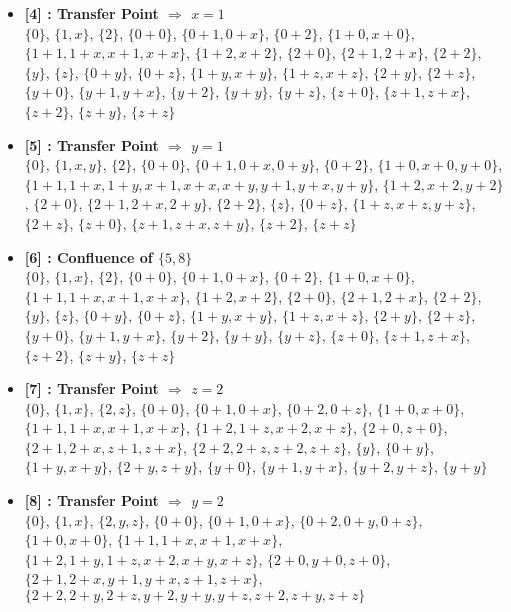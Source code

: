 \begin{itemize}
    \item \textbf{[4] : Transfer Point $\Rightarrow$ $x = 1$}\\
        $\{0\}$, $\{1, x\}$, $\{2\}$, $\{0 + 0\}$, $\{0 + 1, 0 + x\}$, $\{0 + 2\}$, $\{1 + 0, x + 0\}$, $\{1 + 1, 1 + x, x + 1, x + x\}$, $\{1 + 2, x + 2\}$, $\{2 + 0\}$, $\{2 + 1, 2 + x\}$, $\{2 + 2\}$, $\{y\}$, $\{z\}$, $\{0 + y\}$, $\{0 + z\}$, $\{1 + y, x + y\}$, $\{1 + z, x + z\}$, $\{2 + y\}$, $\{2 + z\}$, $\{y + 0\}$, $\{y + 1, y + x\}$, $\{y + 2\}$, $\{y + y\}$, $\{y + z\}$, $\{z + 0\}$, $\{z + 1, z + x\}$, $\{z + 2\}$, $\{z + y\}$, $\{z + z\}$

    \item \textbf{[5] : Transfer Point $\Rightarrow$ $y = 1$}\\
        $\{0\}$, $\{1, x, y\}$, $\{2\}$, $\{0 + 0\}$, $\{0 + 1, 0 + x, 0 + y\}$, $\{0 + 2\}$, $\{1 + 0, x + 0, y + 0\}$, $\{1 + 1, 1 + x, 1 + y, x + 1, x + x, x + y, y + 1, y + x, y + y\}$, $\{1 + 2, x + 2, y + 2\}$, $\{2 + 0\}$, $\{2 + 1, 2 + x, 2 + y\}$, $\{2 + 2\}$, $\{z\}$, $\{0 + z\}$, $\{1 + z, x + z, y + z\}$, $\{2 + z\}$, $\{z + 0\}$, $\{z + 1, z + x, z + y\}$, $\{z + 2\}$, $\{z + z\}$

    \item \textbf{[6] : Confluence of $\{5, 8\}$}\\
        $\{0\}$, $\{1, x\}$, $\{2\}$, $\{0 + 0\}$, $\{0 + 1, 0 + x\}$, $\{0 + 2\}$, $\{1 + 0, x + 0\}$, $\{1 + 1, 1 + x, x + 1, x + x\}$, $\{1 + 2, x + 2\}$, $\{2 + 0\}$, $\{2 + 1, 2 + x\}$, $\{2 + 2\}$, $\{y\}$, $\{z\}$, $\{0 + y\}$, $\{0 + z\}$, $\{1 + y, x + y\}$, $\{1 + z, x + z\}$, $\{2 + y\}$, $\{2 + z\}$, $\{y + 0\}$, $\{y + 1, y + x\}$, $\{y + 2\}$, $\{y + y\}$, $\{y + z\}$, $\{z + 0\}$, $\{z + 1, z + x\}$, $\{z + 2\}$, $\{z + y\}$, $\{z + z\}$

    \item \textbf{[7] : Transfer Point $\Rightarrow$ $z = 2$}\\
        $\{0\}$, $\{1, x\}$, $\{2, z\}$, $\{0 + 0\}$, $\{0 + 1, 0 + x\}$, $\{0 + 2, 0 + z\}$, $\{1 + 0, x + 0\}$, $\{1 + 1, 1 + x, x + 1, x + x\}$, $\{1 + 2, 1 + z, x + 2, x + z\}$, $\{2 + 0, z + 0\}$, $\{2 + 1, 2 + x, z + 1, z + x\}$, $\{2 + 2, 2 + z, z + 2, z + z\}$, $\{y\}$, $\{0 + y\}$, $\{1 + y, x + y\}$, $\{2 + y, z + y\}$, $\{y + 0\}$, $\{y + 1, y + x\}$, $\{y + 2, y + z\}$, $\{y + y\}$

    \item \textbf{[8] : Transfer Point $\Rightarrow$ $y = 2$}\\
        $\{0\}$, $\{1, x\}$, $\{2, y, z\}$, $\{0 + 0\}$, $\{0 + 1, 0 + x\}$, $\{0 + 2, 0 + y, 0 + z\}$, $\{1 + 0, x + 0\}$, $\{1 + 1, 1 + x, x + 1, x + x\}$, $\{1 + 2, 1 + y, 1 + z, x + 2, x + y, x + z\}$, $\{2 + 0, y + 0, z + 0\}$, $\{2 + 1, 2 + x, y + 1, y + x, z + 1, z + x\}$, $\{2 + 2, 2 + y, 2 + z, y + 2, y + y, y + z, z + 2, z + y, z + z\}$

\end{itemize}

